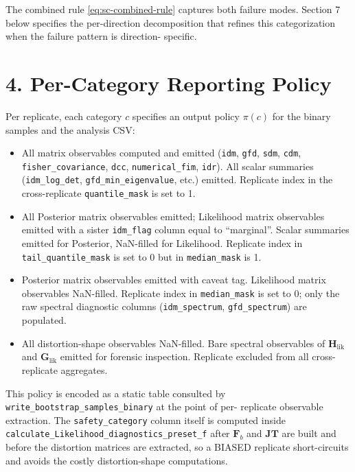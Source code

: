\documentclass[11pt]{article}
\begin{document}
The combined rule \eqref{eq:sc-combined-rule} captures both failure
modes. Section 7 below specifies the per-direction decomposition that
refines this categorization when the failure pattern is direction-
specific.

\section*{4. Per-Category Reporting Policy}
\label{sec:sc-reporting-policy}

Per replicate, each category $c$ specifies an output policy
$\pi(c)$ for the binary samples and the analysis CSV:

\begin{itemize}
\item[$c = 0$ (SAFE):] All matrix observables computed and emitted
  (\texttt{idm}, \texttt{gfd}, \texttt{sdm}, \texttt{cdm},
  \texttt{fisher\_covariance}, \texttt{dcc}, \texttt{numerical\_fim},
  \texttt{idr}). All scalar summaries
  (\texttt{idm\_log\_det}, \texttt{gfd\_min\_eigenvalue}, etc.) emitted.
  Replicate index in the cross-replicate \texttt{quantile\_mask} is set
  to 1.

\item[$c = 1$ (MARGINAL):] All Posterior matrix observables emitted;
  Likelihood matrix observables emitted with a sister
  \texttt{idm\_flag} column equal to ``marginal''. Scalar summaries
  emitted for Posterior, NaN-filled for Likelihood. Replicate index
  in \texttt{tail\_quantile\_mask} is set to 0 but in
  \texttt{median\_mask} is 1.

\item[$c = 2$ (UNRELIABLE):] Posterior matrix observables emitted with
  caveat tag. Likelihood matrix observables NaN-filled. Replicate
  index in \texttt{median\_mask} is set to 0; only the raw spectral
  diagnostic columns
  (\texttt{idm\_spectrum}, \texttt{gfd\_spectrum}) are populated.

\item[$c = 3$ (BIASED):] All distortion-shape observables NaN-filled.
  Bare spectral observables of $\mathbf H_{\mathrm{lik}}$ and
  $\mathbf G_{\mathrm{lik}}$ emitted for forensic inspection.
  Replicate excluded from all cross-replicate aggregates.
\end{itemize}

This policy is encoded as a static table consulted by
\texttt{write\_bootstrap\_samples\_binary} at the point of per-
replicate observable extraction. The \texttt{safety\_category} column
itself is computed inside
\texttt{calculate\_Likelihood\_diagnostics\_preset\_f} after
$\mathbf F_b$ and $\mathbf{JT}$ are built and before the distortion
matrices are extracted, so a BIASED replicate short-circuits and
avoids the costly distortion-shape computations.
\end{document}
